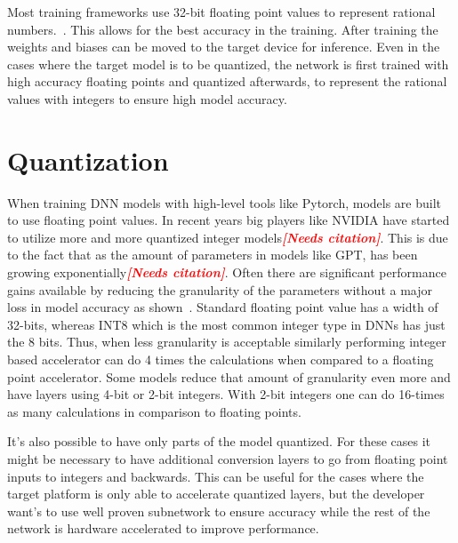 \documentclass[12pt,a4paper,english
]{tunithesis}
\newcommand{\fixthis}[1]{\textbf{\textit{\textcolor{red}{[#1]}}}}
\begin{document}
Most training frameworks use 32-bit floating point values to represent rational numbers.~\cite{paszke_pytorch_2019}\cite{tensorflow2015-whitepaper}. This allows for the best accuracy in the training. After training the weights and biases can be moved to the target device for inference. Even in the cases where the target model is to be quantized, the network is first trained with high accuracy floating points and quantized afterwards, to represent the rational values with integers to ensure high model accuracy.

\section{Quantization}
When training DNN models with high-level tools like Pytorch, models are built to use floating point values. In recent years big players like NVIDIA have started to utilize more and more quantized integer models\fixthis{Needs citation}. This is due to the fact that as the amount of parameters in models like GPT, has been growing exponentially\fixthis{Needs citation}. Often there are significant performance gains available by reducing the granularity of the parameters without a major loss in model accuracy as shown~\cite{krishnamoorthi_quantizing_2018,draghici_capabilities_2002}. Standard floating point value has a width of 32-bits, whereas INT8 which is the most common integer type in DNNs has just the 8 bits. Thus, when less granularity is acceptable similarly performing integer based accelerator can do 4 times the calculations when compared to a floating point accelerator.
Some models reduce that amount of granularity even more and have layers using 4-bit or 2-bit integers. With 2-bit integers one can do 16-times as many calculations in comparison to floating points.

It's also possible to have only parts of the model quantized. For these cases it might be necessary to have additional conversion layers to go from floating point inputs to integers and backwards. This can be useful for the cases where the target platform is only able to accelerate quantized layers, but the developer want's to use well proven subnetwork to ensure accuracy while the rest of the network is hardware accelerated to improve performance.
\end{document}
